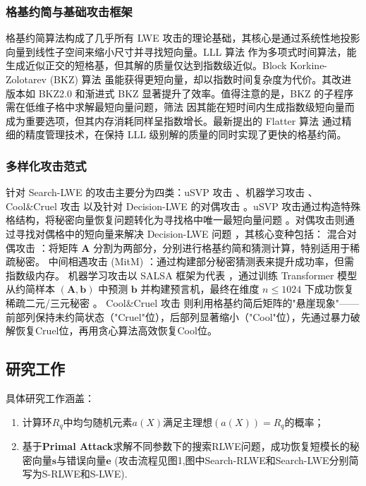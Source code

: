 \documentclass[12pt,a4paper]{article}
\numberwithin{equation}{section}
\begin{document}
\subsubsection{格基约简与基础攻击框架}
格基约简算法构成了几乎所有 LWE 攻击的理论基础，其核心是通过系统性地投影向量到线性子空间来缩小尺寸并寻找短向量。LLL 算法 \cite{lenstra1982factoring} 作为多项式时间算法，能生成近似正交的短格基，但其解的质量仅达到指数级近似。Block Korkine-Zolotarev (BKZ) 算法 \cite{schnorr1987hierarchy} 虽能获得更短向量，却以指数时间复杂度为代价。其改进版本如 BKZ2.0 \cite{chen2011bkz} 和渐进式 BKZ \cite{aono2016improved,wang2022improved,xia2022improved} 显著提升了效率。值得注意的是，BKZ 的子程序需在低维子格中求解最短向量问题，筛法 \cite{albrecht2019general,ducas2021advanced} 因其能在短时间内生成指数级短向量而成为重要选项，但其内存消耗同样呈指数增长。最新提出的 Flatter 算法 \cite{ryan2023fast} 通过精细的精度管理技术，在保持 LLL 级别解的质量的同时实现了更快的格基约简。

\subsubsection{多样化攻击范式}
针对 Search-LWE 的攻击主要分为四类：uSVP 攻击 \cite{albrecht2021homomorphic}、机器学习攻击 \cite{stevens2024salsa}、Cool\&Cruel 攻击 \cite{nolte2024cool} 以及针对 Decision-LWE 的对偶攻击 \cite{albrecht2020faster,cheon2019hybrid}。uSVP 攻击通过构造特殊格结构，将秘密向量恢复问题转化为寻找格中唯一最短向量问题 \cite{albrecht2021homomorphic}。对偶攻击则通过寻找对偶格中的短向量来解决 Decision-LWE 问题 \cite{micciancio2009}，其核心变种包括：
混合对偶攻击 \cite{albrecht2017dual}：将矩阵 $\mathbf{A}$ 分割为两部分，分别进行格基约简和猜测计算，特别适用于稀疏秘密。
中间相遇攻击 (MitM) \cite{cheon2019hybrid}：通过构建部分秘密猜测表来提升成功率，但需指数级内存。
机器学习攻击以 SALSA 框架为代表 \cite{wenger2022salsa,stevens2024salsa,wengersalsa,li2023salsapicante}，通过训练 Transformer 模型从约简样本 $(\mathbf{A}, \mathbf{b})$ 中预测 $\mathbf{b}$ 并构建预言机，最终在维度 $n \leq 1024$ 下成功恢复稀疏二元/三元秘密 \cite{stevens2024salsa}。
Cool\&Cruel 攻击 \cite{nolte2024cool} 则利用格基约简后矩阵的"悬崖现象"——前部列保持未约简状态（"Cruel"位），后部列显著缩小（"Cool"位），先通过暴力破解恢复Cruel位，再用贪心算法高效恢复Cool位。

\subsection*{研究工作}
具体研究工作涵盖：
\begin{enumerate}
    \item 计算环$R_q$中均匀随机元素$a(X)$满足主理想$( a(X) )  = R_q$的概率；
    \item 基于\textbf{Primal Attack}求解不同参数下的搜索RLWE问题，成功恢复短模长的秘密向量$\mathbf{s}$与错误向量$\mathbf{e}$ (攻击流程见图1,图中Search-RLWE和Search-LWE分别简写为S-RLWE和S-LWE).
\end{enumerate}
\end{document}
